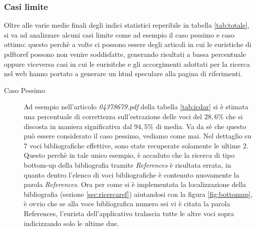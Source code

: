 \subsubsection{Casi limite}
Oltre alle varie medie finali degli indici statistici reperibile in tabella \ref{tab:totale}, si va ad analizzare alcuni casi limite come ad esempio il caso pessimo e caso ottimo: questo perchè a volte ci possono essere degli articoli in cui le euristiche di pdftoref possono non venire soddisfatte, generando risultati a bassa percentuale oppure viceversa casi in cui le eurisitche e gli accorgimenti adottati per la ricerca nel web hanno portato a generare un html speculare alla pagina di riferimenti.
\begin{description}
	\item[Caso Pessimo]Ad esempio nell'articolo \textit{04378679.pdf} della tabella \ref{tab:icdar} si è stimata una percentuale di correttezza sull'estrazione delle voci del $28,6\%$ che si discosta in maniera significativa dal $94,5\%$ di media. Va da sè che questo può essere considerato il caso pessimo, vediamo come mai. Nel dettaglio su 7 voci bibliografiche effettive, sono state recuperate solamente le ultime 2. Questo perchè in tale unico esempio, è accaduto che la ricerca di tipo bottom-up della bibliografia tramite \textit{References} è risultata errata, in quanto dentro l'elenco di voci bibliografiche è contenuto nuovamente la parola \textit{References}. Ora per come si è implementata la localizzazione della bibliografia (sezione \ref{sec:ricercaref}) aiutandosi con la figura \ref{fig:bottomup}, è ovvio che se alla voce bibliografica numero sei vi è citata la parola References, l'eurista dell'applicativo tralascia tutte le altre voci sopra indicizzando solo le ultime due.\\
	

\end{description}
